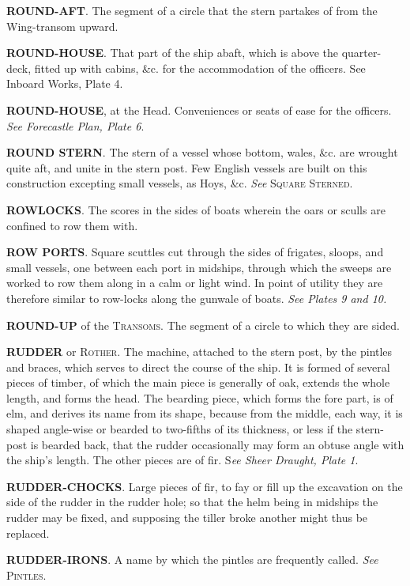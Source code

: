 \textbf{ROUND-AFT}. The segment of a circle that the stern partakes of from the Wing-transom upward. 

\textbf{ROUND-HOUSE}. That part of the ship abaft, which is above the quarter-deck, fitted up with cabins, \&c. for the accommodation of the officers. See Inboard Works, Plate 4. 

\textbf{ROUND-HOUSE}, at the Head. Conveniences or seats of ease for the officers. \textit{See Forecastle Plan, Plate 6}. 

\textbf{ROUND STERN}. The stern of a vessel whose bottom, wales, \&c. are wrought quite aft, and unite in the stern post. Few English vessels are built on this construction excepting small vessels, as Hoys, \&c. \textit{See} \textsc{Square Sterned}. 

\textbf{ROWLOCKS}. The scores in the sides of boats wherein the oars or sculls are confined to row them with. 

\textbf{ROW PORTS}. Square scuttles cut through the sides of frigates, sloops, and small vessels, one between each port in midships, through which the sweeps are worked to row them along in a calm or light wind. In point of utility they are therefore similar to row-locks along the gunwale of boats. \textit{See Plates 9 and 10.} 

\textbf{ROUND-UP} of the \textsc{Transoms}. The segment of a circle to which they are sided. 

\textbf{RUDDER} or \textsc{Rother}. The machine, attached to the stern post, by the pintles and braces, which serves to direct the course of the ship. It is formed of several pieces of timber, of which the main piece is generally of oak, extends the whole length, and forms the head. The bearding piece, which forms the fore part, is of elm, and derives its name from its shape, because from the middle, each way, it is shaped angle-wise or bearded to two-fifths of its thickness, or less if the stern-post is bearded back, that the rudder occasionally may form an obtuse angle with the ship's length. The other pieces are of fir. S\textit{ee Sheer Draught, Plate 1}. 

\textbf{RUDDER-CHOCKS}. Large pieces of fir, to fay or fill up the excavation on the side of the rudder in the rudder hole; so that the helm being in midships the rudder may be fixed, and supposing the tiller broke another might thus be replaced. 

\textbf{RUDDER-IRONS}. A name by which the pintles are frequently called. \textit{See} \textsc{Pintles}. 

